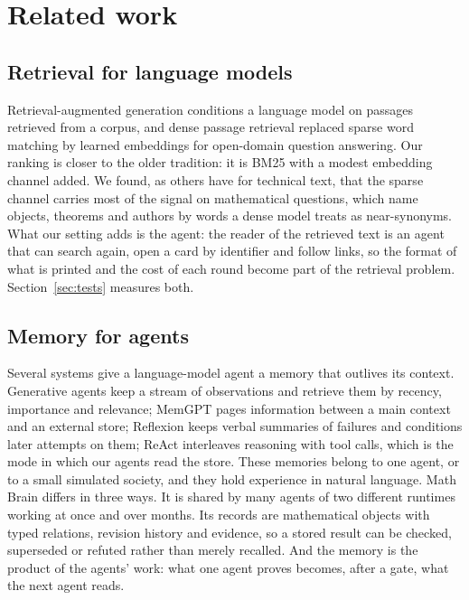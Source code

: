 \section{Related work}\label{sec:related}

\subsection{Retrieval for language models}
Retrieval-augmented generation \cite{Lewis2020RAG} conditions a language model on passages retrieved from a corpus, and dense passage retrieval \cite{Karpukhin2020DPR} replaced sparse word matching by learned embeddings for open-domain question answering. Our ranking is closer to the older tradition: it is BM25 \cite{RobertsonZaragoza2009} with a modest embedding channel added. We found, as others have for technical text, that the sparse channel carries most of the signal on mathematical questions, which name objects, theorems and authors by words a dense model treats as near-synonyms. What our setting adds is the agent: the reader of the retrieved text is an agent that can search again, open a card by identifier and follow links, so the format of what is printed and the cost of each round become part of the retrieval problem. Section~\ref{sec:tests} measures both.

\subsection{Memory for agents}
Several systems give a language-model agent a memory that outlives its context. Generative agents \cite{Park2023Generative} keep a stream of observations and retrieve them by recency, importance and relevance; MemGPT \cite{Packer2023MemGPT} pages information between a main context and an external store; Reflexion \cite{Shinn2023Reflexion} keeps verbal summaries of failures and conditions later attempts on them; ReAct \cite{Yao2023ReAct} interleaves reasoning with tool calls, which is the mode in which our agents read the store. These memories belong to one agent, or to a small simulated society, and they hold experience in natural language. Math Brain differs in three ways. It is shared by many agents of two different runtimes working at once and over months. Its records are mathematical objects with typed relations, revision history and evidence, so a stored result can be checked, superseded or refuted rather than merely recalled. And the memory is the product of the agents' work: what one agent proves becomes, after a gate, what the next agent reads.

